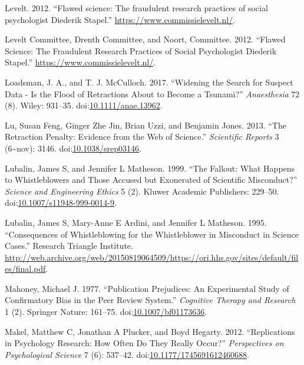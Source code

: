\documentclass[a5paper]{book}
\begin{document}
\hypertarget{ref-Levelt2012}{}
Levelt. 2012. ``Flawed science: The fraudulent research practices of
social psychologist Diederik Stapel.''
\url{https://www.commissielevelt.nl/}.

\hypertarget{ref-levelt2012}{}
Levelt Committee, Drenth Committee, and Noort, Committee. 2012. ``Flawed
Science: The Fraudulent Research Practices of Social Psychologist
Diederik Stapel.'' \url{https://www.commissielevelt.nl/}.

\hypertarget{ref-doi:10.1111ux2fanae.13962}{}
Loadsman, J. A., and T. J. McCulloch. 2017. ``Widening the Search for
Suspect Data - Is the Flood of Retractions About to Become a Tsunami?''
\emph{Anaesthesia} 72 (8). Wiley: 931--35.
doi:\href{https://doi.org/10.1111/anae.13962}{10.1111/anae.13962}.

\hypertarget{ref-doi:10.1038ux2fsrep03146}{}
Lu, Susan Feng, Ginger Zhe Jin, Brian Uzzi, and Benjamin Jones. 2013.
``The Retraction Penalty: Evidence from the Web of Science.''
\emph{Scientific Reports} 3 (6\textasciitilde{}nov): 3146.
doi:\href{https://doi.org/10.1038/srep03146}{10.1038/srep03146}.

\hypertarget{ref-doi:10.1007ux2fs11948-999-0014-9}{}
Lubalin, James S, and Jennifer L Matheson. 1999. ``The Fallout: What
Happens to Whistleblowers and Those Accused but Exonerated of Scientific
Misconduct?'' \emph{Science and Engineering Ethics} 5 (2). Kluwer
Academic Publishers: 229--50.
doi:\href{https://doi.org/10.1007/s11948-999-0014-9}{10.1007/s11948-999-0014-9}.

\hypertarget{ref-lubalin1995}{}
Lubalin, James S, Mary-Anne E Ardini, and Jennifer L Matheson. 1995.
``Consequences of Whistleblowing for the Whistleblower in Misconduct in
Science Cases.'' Research Triangle Institute.
\url{http://web.archive.org/web/20150819064509/https://ori.hhs.gov/sites/default/files/final.pdf}.

\hypertarget{ref-doi:10.1007ux2fbf01173636}{}
Mahoney, Michael J. 1977. ``Publication Prejudices: An Experimental
Study of Confirmatory Bias in the Peer Review System.'' \emph{Cognitive
Therapy and Research} 1 (2). Springer Nature: 161--75.
doi:\href{https://doi.org/10.1007/bf01173636}{10.1007/bf01173636}.

\hypertarget{ref-doi:10.1177ux2f1745691612460688}{}
Makel, Matthew C, Jonathan A Plucker, and Boyd Hegarty. 2012.
``Replications in Psychology Research: How Often Do They Really Occur?''
\emph{Perspectives on Psychological Science} 7 (6): 537--42.
doi:\href{https://doi.org/10.1177/1745691612460688}{10.1177/1745691612460688}.
\end{document}
